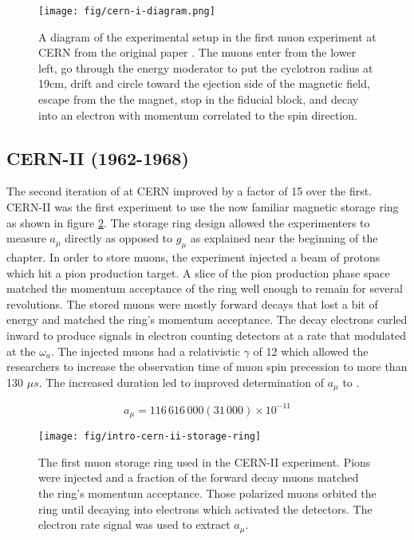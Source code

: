 \begin{figure}
\centering
\texttt{[image: fig/cern-i-diagram.png]}
\caption{A diagram of the experimental setup in the first muon \gmtwo experiment at CERN from the original paper \cite{cern-i}. The muons enter from the lower left, go through the energy moderator to put the cyclotron radius at 19cm, drift and circle toward the ejection side of the magnetic field, escape from the the magnet, stop in the fiducial block, and decay into an electron with momentum correlated to the spin direction. \label{fig:cern-i-diagram}}
\end{figure}

\subsection{CERN-II (1962-1968)}
The second iteration of \mugmtwo at CERN improved by a factor of 15 over the first.  CERN-II was the first \mugmtwo experiment to use the now familiar magnetic storage ring as shown in figure \ref{fig:intro-cern-ii-storage-ring}.  The storage ring design allowed the experimenters to measure $a_\mu$ directly as opposed to $g_\mu$ as explained near the beginning of the chapter. In order to store muons, the experiment injected a beam of protons which hit a pion production target.  A slice of the pion production phase space matched the momentum acceptance of the ring well enough to remain for several revolutions. The stored muons were mostly forward decays that lost a bit of energy and matched the ring's momentum acceptance.  The decay electrons curled inward to produce signals in electron counting detectors at a rate that modulated at the $\omega_a$.  The injected muons had a relativistic $\gamma$ of 12 which allowed the researchers to increase the observation time of muon spin precession to more than 130 $\mu s$.  The increased duration led to improved determination of $a_\mu$ to  \cite{47y-muon-g-2}.

\begin{equation}
\label{eqn:cern-ii-results}
a_\mu = 116\,616\,000 (31\,000) \times 10^{-11}
\end{equation}

\begin{figure}
\centering
\texttt{[image: fig/intro-cern-ii-storage-ring]}
\caption{
    The first muon storage ring used in the CERN-II experiment.  Pions were injected and a fraction of the forward decay muons matched the ring's momentum acceptance.  Those polarized muons orbited the ring until decaying into electrons which activated the detectors.  The electron rate signal was used to extract $a_\mu$.
    \label{fig:intro-cern-ii-storage-ring}    
}
\end{figure}


